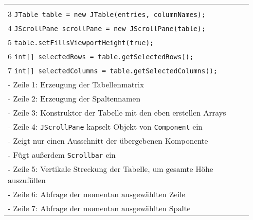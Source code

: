 \begin{longtable}{ | p{} p{} | }
{	\hspace{0.8cm} 2 \hspace{0.1cm} \texttt{Object[] columnNames = ...;} \\
	\hspace{0.8cm} 3 \hspace{0.1cm} \texttt{JTable table = new JTable(entries, columnNames);} \\
	\hspace{0.8cm} 4 \hspace{0.1cm} \texttt{JScrollPane scrollPane = new JScrollPane(table);} \\
	\hspace{0.8cm} 5 \hspace{0.1cm} \texttt{table.setFillsViewportHeight(true);} \\
	\hspace{0.8cm} 6 \hspace{0.1cm} \texttt{int[] selectedRows = table.getSelectedRows();} \\
	\hspace{0.8cm} 7 \hspace{0.1cm} \texttt{int[] selectedColumns = table.getSelectedColumns();} \\
	\hspace{0.6cm} - Zeile 1: Erzeugung der Tabellenmatrix \\
	\hspace{0.6cm} - Zeile 2: Erzeugung der Spaltennamen \\
	\hspace{0.6cm} - Zeile 3: Konstruktor der Tabelle mit den eben erstellen Arrays \\
	\hspace{0.6cm} - Zeile 4: \texttt{JScrollPane} kapselt Objekt von \texttt{Component} ein \\
	\hspace{0.6cm} - Zeigt nur einen Ausschnitt der übergebenen Komponente \\
	\hspace{0.6cm} - Fügt au\ss erdem \texttt{Scrollbar} ein \\
	\hspace{0.6cm} - Zeile 5: Vertikale Streckung der Tabelle, um gesamte Höhe auszufüllen \\
	\hspace{0.6cm} - Zeile 6: Abfrage der momentan ausgewählten Zeile \\
	\hspace{0.6cm} - Zeile 7: Abfrage der momentan ausgewählten Spalte} \\ \hline
	
	
	
	\end{longtable}






